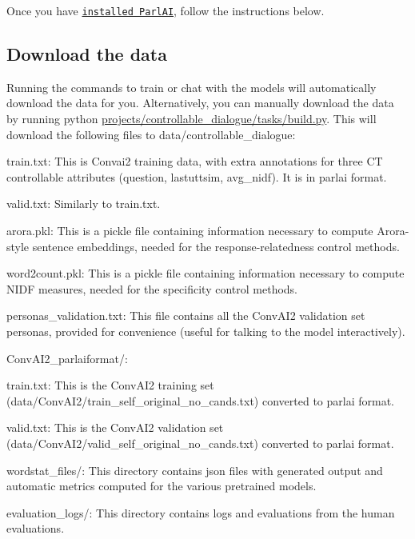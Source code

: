 Once you have \href{https://github.com/facebookresearch/ParlAI/#installing-parlai}{\tt installed Parl\+AI}, follow the instructions below.

\subsection*{Download the data}

Running the commands to train or chat with the models will automatically download the data for you. Alternatively, you can manually download the data by running {\ttfamily python \hyperlink{projects_2controllable__dialogue_2tasks_2build_8py}{projects/controllable\+\_\+dialogue/tasks/build.\+py}}. This will download the following files to {\ttfamily data/controllable\+\_\+dialogue}\+:


\begin{DoxyItemize}
\item {\ttfamily train.\+txt}\+: This is Convai2 training data, with extra annotations for three CT controllable attributes ({\ttfamily question}, {\ttfamily lastuttsim}, {\ttfamily avg\+\_\+nidf}). It is in parlai format.
\item {\ttfamily valid.\+txt}\+: Similarly to train.\+txt.
\item {\ttfamily arora.\+pkl}\+: This is a pickle file containing information necessary to compute Arora-\/style sentence embeddings, needed for the response-\/relatedness control methods.
\item {\ttfamily word2count.\+pkl}\+: This is a pickle file containing information necessary to compute N\+I\+DF measures, needed for the specificity control methods.
\item {\ttfamily personas\+\_\+validation.\+txt}\+: This file contains all the Conv\+A\+I2 validation set personas, provided for convenience (useful for talking to the model interactively).
\item {\ttfamily Conv\+A\+I2\+\_\+parlaiformat/}\+:
\begin{DoxyItemize}
\item {\ttfamily train.\+txt}\+: This is the Conv\+A\+I2 training set ({\ttfamily data/\+Conv\+A\+I2/train\+\_\+self\+\_\+original\+\_\+no\+\_\+cands.\+txt}) converted to parlai format.
\item {\ttfamily valid.\+txt}\+: This is the Conv\+A\+I2 validation set ({\ttfamily data/\+Conv\+A\+I2/valid\+\_\+self\+\_\+original\+\_\+no\+\_\+cands.\+txt}) converted to parlai format.
\end{DoxyItemize}
\item {\ttfamily wordstat\+\_\+files/}\+: This directory contains json files with generated output and automatic metrics computed for the various pretrained models.
\item {\ttfamily evaluation\+\_\+logs/}\+: This directory contains logs and evaluations from the human evaluations.
\end{DoxyItemize}

